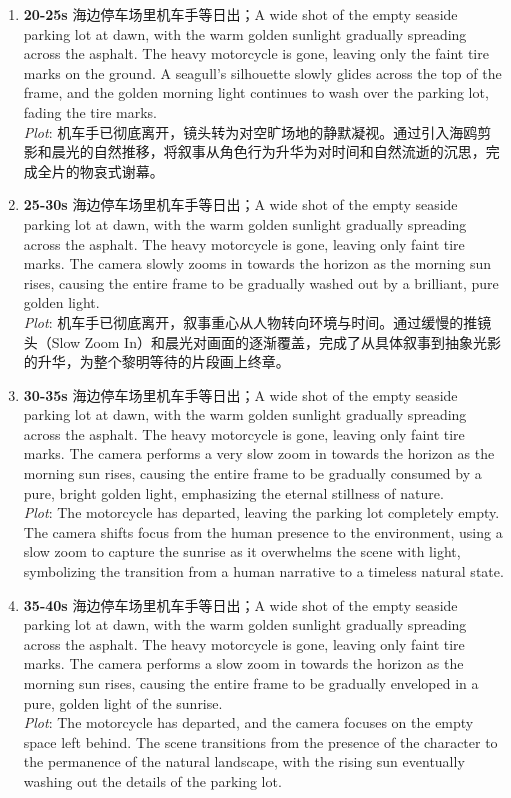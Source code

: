 \documentclass[11pt,a4paper]{article}
\begin{document}
\begin{enumerate}
\item \textbf{20-25s} 海边停车场里机车手等日出；A wide shot of the empty seaside parking lot at dawn, with the warm golden sunlight gradually spreading across the asphalt. The heavy motorcycle is gone, leaving only the faint tire marks on the ground. A seagull's silhouette slowly glides across the top of the frame, and the golden morning light continues to wash over the parking lot, fading the tire marks.\\\newline \textit{Plot}: 机车手已彻底离开，镜头转为对空旷场地的静默凝视。通过引入海鸥剪影和晨光的自然推移，将叙事从角色行为升华为对时间和自然流逝的沉思，完成全片的物哀式谢幕。
\item \textbf{25-30s} 海边停车场里机车手等日出；A wide shot of the empty seaside parking lot at dawn, with the warm golden sunlight gradually spreading across the asphalt. The heavy motorcycle is gone, leaving only faint tire marks. The camera slowly zooms in towards the horizon as the morning sun rises, causing the entire frame to be gradually washed out by a brilliant, pure golden light.\\\newline \textit{Plot}: 机车手已彻底离开，叙事重心从人物转向环境与时间。通过缓慢的推镜头（Slow Zoom In）和晨光对画面的逐渐覆盖，完成了从具体叙事到抽象光影的升华，为整个黎明等待的片段画上终章。
\item \textbf{30-35s} 海边停车场里机车手等日出；A wide shot of the empty seaside parking lot at dawn, with the warm golden sunlight gradually spreading across the asphalt. The heavy motorcycle is gone, leaving only faint tire marks. The camera performs a very slow zoom in towards the horizon as the morning sun rises, causing the entire frame to be gradually consumed by a pure, bright golden light, emphasizing the eternal stillness of nature.\\\newline \textit{Plot}: The motorcycle has departed, leaving the parking lot completely empty. The camera shifts focus from the human presence to the environment, using a slow zoom to capture the sunrise as it overwhelms the scene with light, symbolizing the transition from a human narrative to a timeless natural state.
\item \textbf{35-40s} 海边停车场里机车手等日出；A wide shot of the empty seaside parking lot at dawn, with the warm golden sunlight gradually spreading across the asphalt. The heavy motorcycle is gone, leaving only faint tire marks. The camera performs a slow zoom in towards the horizon as the morning sun rises, causing the entire frame to be gradually enveloped in a pure, golden light of the sunrise.\\\newline \textit{Plot}: The motorcycle has departed, and the camera focuses on the empty space left behind. The scene transitions from the presence of the character to the permanence of the natural landscape, with the rising sun eventually washing out the details of the parking lot.

\end{enumerate}
\end{document}
